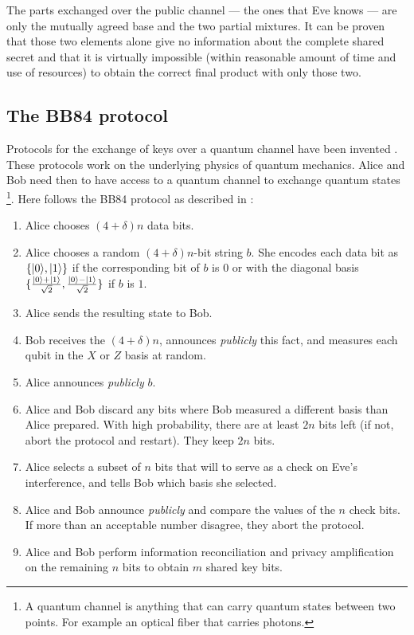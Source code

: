 	The parts exchanged over the public channel --- the ones that Eve knows --- are only the mutually agreed base and the two partial mixtures. 
	It can be proven that those two elements alone give no information about the complete shared secret and that it is virtually impossible (within reasonable amount of time and use of resources) to obtain the correct final product with only those two.\\  
	
	\subsection{The BB84 protocol}
	Protocols for the exchange of keys over a quantum channel have been invented \cite{BB84, Ekert91}.
	These protocols work on the underlying physics of quantum mechanics.
	Alice and Bob need then to have access to a quantum channel to exchange quantum states
	\footnote{A quantum channel is anything that can carry quantum states between two points. For example an optical fiber that carries photons.}.
	Here follows the BB84 protocol as described in \cite{NC10} :
		\begin{enumerate}
			\item Alice chooses $(4+\delta )n$ data bits.
			\item Alice chooses a random $(4+\delta )n$-bit string $b$. She encodes each data bit as $\{|0 \rangle,|1 \rangle\}$ if the corresponding bit of $b$ is $0$ or with the diagonal basis $\{\frac{|0 \rangle + |1 \rangle}{\sqrt{2}},\frac{|0 \rangle - |1 \rangle}{\sqrt{2}}\}$ if $b$ is $1$.
			\item Alice sends the resulting state to Bob.
			\item Bob receives the $(4+\delta )n$, announces \emph{publicly} this fact, and measures each qubit in the $X$ or $Z$ basis at random.
			\item Alice announces \emph{publicly} $b$.
			\item Alice and Bob discard any bits where Bob measured a different basis than Alice prepared. With high probability, there are at least $2n$ bits left (if not, abort the protocol and restart). They keep $2n$ bits.
			\item Alice selects a subset of $n$ bits that will to serve as a check on Eve's interference, and tells Bob which basis she selected.
			\item Alice and Bob announce \emph{publicly} and compare the values of the $n$ check bits. If more than an acceptable number disagree, they abort the protocol.
			\item Alice and Bob perform information reconciliation and privacy amplification on the remaining $n$ bits to obtain $m$ shared key bits.
		\end{enumerate}

